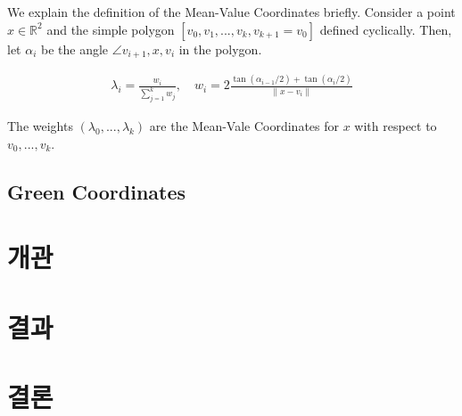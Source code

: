 \documentclass[12pt,a4paper,oneside,draft]{report}
\providecommand{\norm}[1]{\lVert#1\rVert}
\begin{document}
We explain the definition of the Mean-Value Coordinates briefly. Consider a
point $x \in \mathbb{R}^2$ and the simple polygon $[v_0, v_1, ..., v_k, v_{k+1}
= v_0]$ defined cyclically. Then, let $\alpha_i$ be the angle $\angle
v_{i+1},x,v_{i}$ in the polygon.

\begin{align}
\lambda_i = \frac{w_i}{\sum_{j=1}^{k}w_j}, \quad w_i =
2\frac{\tan(\alpha_{i-1}/2) + \tan(\alpha_{i}/2)}{\norm{x - v_i}}
\end{align}

The weights $(\lambda_0, ..., \lambda_k)$ are the Mean-Vale Coordinates for $x$
with respect to $v_0, ...  , v_k$.

\section{Green Coordinates}

\chapter{개관}

\chapter{결과}

\chapter{결론}

\printbibliography
\end{document}

